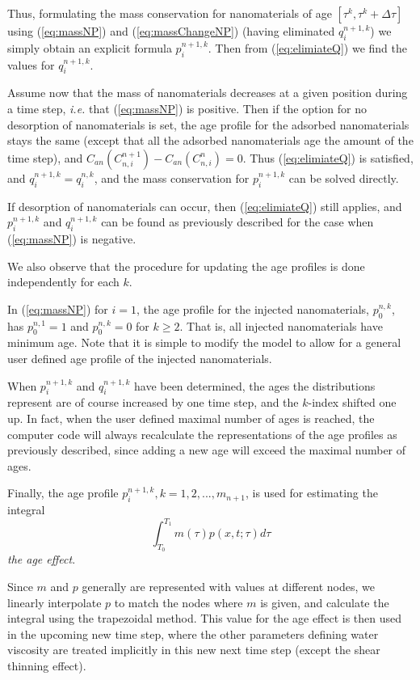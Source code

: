 \documentclass[nanomaterials,article,submit,moreauthors,pdftex]{Definitions/mdpi}
\begin{document}
Thus, formulating the mass conservation for nanomaterials of age $\left[\tau^k, \tau^k+\Delta\tau\right]$ using (\ref{eq:massNP}) and (\ref{eq:massChangeNP}) (having eliminated  $q_i^{n+1,k}$) we simply obtain an explicit formula $p_i^{n+1,k}$. Then from (\ref{eq:elimiateQ}) we find the values for $q_i^{n+1,k}$.

Assume now that the mass of nanomaterials decreases at a given position during a time step, \textit{i.e.} that (\ref{eq:massNP}) is positive. Then if the option for no desorption of nanomaterials is set, the age profile for the adsorbed nanomaterials stays the same (except that all the adsorbed nanomaterials age the amount of the time step), and $C_{an}(C_{n,i}^{n+1})- C_{an}(C_{n,i}^{n})=0$. Thus (\ref{eq:elimiateQ}) is satisfied, and $q_i^{n+1,k}=q_i^{n,k}$, and the mass conservation for $p_i^{n+1,k}$ can be solved directly.

If desorption of nanomaterials can occur, then (\ref{eq:elimiateQ}) still applies, and $p_i^{n+1,k}$ and  $q_i^{n+1,k}$ can be found as previously described for the case when (\ref{eq:massNP}) is negative. 

We also observe that the procedure for updating the age profiles is done independently for each $k$.

In (\ref{eq:massNP}) for $i=1$, the age profile for the injected nanomaterials, $p_0^{n,k}$, has $p_0^{n,1}=1$ and $p_0^{n,k}=0$ for $k\geq2$. That is, all injected nanomaterials have minimum age. Note that it is simple to modify the model to allow for a general user defined age profile of the injected nanomaterials.

When $p_i^{n+1,k}$ and $q_i^{n+1,k}$ have been determined, the ages the distributions represent are of course increased by one time step, and the  $k$-index shifted one up. In fact, when the user defined maximal number of ages is reached, the computer code will always recalculate the representations of the age profiles as previously described, since adding a new age will exceed the maximal number of ages.

Finally, the age profile $p_i^{n+1,k},k=1,2,...,m_{n+1}$,  is used for estimating the integral
\begin{equation}
    \int_{T_0}^{T_1} m(\tau)p(x,t;\tau)d\tau
\end{equation}
\textit{the age effect}.

Since $m$ and $p$ generally are represented with values at different nodes, we linearly interpolate $p$ to match the nodes where $m$ is given, and calculate the integral using the trapezoidal method. This value for the age effect is then used in the upcoming new time step, where the other parameters defining water viscosity are treated implicitly in this new next time step (except the shear thinning effect).
\end{document}
